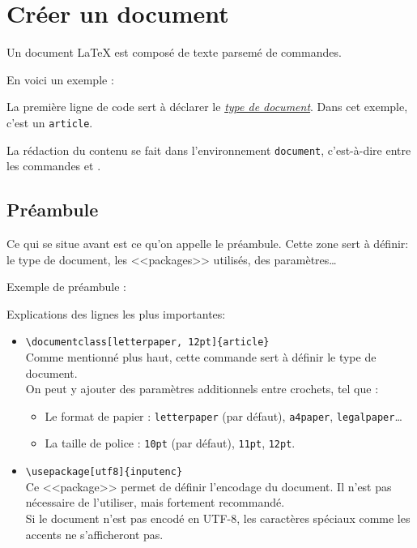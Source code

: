 \section{Créer un document}

Un document \LaTeX{} est composé de texte parsemé de commandes.

En voici un exemple :



La première ligne de code sert à déclarer le \hyperref[documentclass]{\emph{type de document}}.
Dans cet exemple, c'est un \texttt{article}.

La rédaction du contenu se fait dans l'environnement \texttt{document}, c'est-à-dire entre les commandes \lstinline|| et \lstinline||.

\subsection{Préambule}
\label{preamble}

Ce qui se situe avant \lstinline|| est ce qu'on appelle le préambule.
Cette zone sert à définir: le type de document, les <<packages>> utilisés, des paramètres\dots

Exemple de préambule :



Explications des lignes les plus importantes:

\begin{itemize}
  \item \lstinline|\documentclass[letterpaper, 12pt]{article}|\\
  Comme mentionné plus haut, cette commande sert à définir le type de document.\\
  On peut y ajouter des paramètres additionnels entre crochets, tel que :
  \begin{itemize}
    \item Le format de papier : \texttt{letterpaper} (par défaut), \texttt{a4paper}, \texttt{legalpaper}\dots
    \item La taille de police : \texttt{10pt} (par défaut), \texttt{11pt}, \texttt{12pt}.
  \end{itemize}

  \item \lstinline|\usepackage[utf8]{inputenc}|\\
  Ce <<package>> permet de définir l'encodage du document.
  Il n'est pas nécessaire de l'utiliser, mais fortement recommandé.\\
  Si le document n'est pas encodé en UTF-8, les caractères spéciaux comme les accents ne s'afficheront pas.
\end{itemize}

